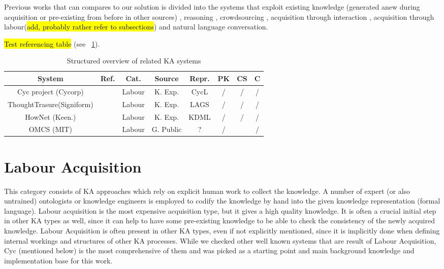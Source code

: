 Previous works that can compares to our solution is divided into the systems that exploit existing knowledge (generated anew during acquisition or pre-existing from before in other sources) \parencite{Singh2002a,Witbrock2003,Forbus2007,Kvo2010,Sharma2010,Mitchel2015}, reasoning \parencite{Witbrock2003,Speer2007,Speer2008,Kuo2010}, crowdsourcing \parencite{Singh2002,Speer2009, Kuo2010, Pedro2012a, Pedro2013}, acquisition through interaction \parencite{Speer2009,Pedro2012,Pedro2013}, acquisition through labour(\hl{add, probably rather refer to subsections}) \parencite{} and natural language conversation\parencite{Pedro2012, Speer2007,Speer2009, Witbrock2003,Kuo2010}.

\hl{Test referencing table} (see \tablename~\ref{tab:related}).

\begin{table}[htb]
	\caption{Structured overview of related KA systems}
	\label{tab:related}
	\centering
	\begin{tabular}{cccccccc}
		\hline
		System & Ref. & Cat. & Source & Repr. & PK &  CS & C \\
		\hline
		Cyc project (Cycorp) & \parencite{Lenat1995} & Labour & K. Exp. & CycL & / & / & / \\
		ThoughtTrasure(Signiform) & \parencite{Mueller2003} & Labour & K. Exp. & LAGS & / & / & / \\
		HowNet (Keen.) & \parencite{Dong2010} & Labour & K. Exp. & KDML & / & / & / \\
		OMCS (MIT) & \parencite{Singh2002} & Labour & G. Public & ? & / & \checkmark & / \\
		\hline
	\end{tabular}
\end{table}

\section{Labour Acquisition}
This category consists of KA approaches which rely on explicit human work to collect the knowledge. A number of expert (or also untrained) ontologists or knowledge engineers is employed to codify the knowledge by hand into the given knowledge representation (formal language). Labour acquisition is the most expensive acquisition type, but it gives a high quality knowledge. It is often a crucial initial step in other KA types as well, since it can help to have some pre-existing knowledge to be able to check the consistency of the newly acquired knowledge. Labour Acquisition is often present in other KA types, even if not explicitly mentioned, since it is implicitly done when defining internal workings and structures of other KA processes. While we checked other well known systems that are result of Labour Acquisition, Cyc (mentioned below) is the most comprehensive of them and was picked as a starting point and main background knowledge and implementation base for this work.

